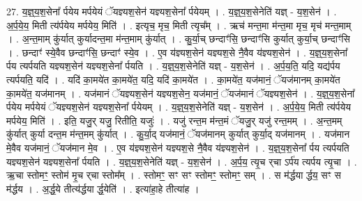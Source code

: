 \documentclass[17pt]{extarticle}
\begin{document}
27. य॒ज्ञ्॒य॒श॒सेना᳚ र्पयेय मर्पयेयं ॅयज्ञ्यश॒सेन॑ यज्ञ्यश॒सेना᳚ र्पयेयम् । . य॒ज्ञ्॒य॒श॒सेनेति॑ यज्ञ् - य॒श॒सेन॑ । . अ॒र्प॒ये॒य॒ मिती त्य॑र्पयेय मर्पयेय॒ मिति॑ । . इत्यृच॒ मृच॒ मिती त्यृच᳚म् । . ऋच॑ मन्त॒मा म॑न्त॒मा मृच॒ मृच॑ मन्त॒माम् । . अ॒न्त॒माम् कु॑र्यात् कुर्यादन्त॒मा म॑न्त॒माम् कु॑र्यात् । . कु॒र्या॒च् छन्दाꣳ॑सि॒ छन्दाꣳ॑सि कुर्यात् कुर्या॒च् छन्दाꣳ॑सि । . छन्दाꣳ॑ स्ये॒वैव छन्दाꣳ॑सि॒ छन्दाꣳ॑ स्ये॒व । . ए॒व य॑ज्ञ्यश॒सेन॑ यज्ञ्यश॒से नै॒वैव य॑ज्ञ्यश॒सेन॑ । . य॒ज्ञ्॒य॒श॒सेना᳚ र्पय त्यर्पयति यज्ञ्यश॒सेन॑ यज्ञ्यश॒सेना᳚ र्पयति । . य॒ज्ञ्॒य॒श॒सेनेति॑ यज्ञ् - य॒श॒सेन॑ । . अ॒र्प॒य॒ति॒ यदि॒ यद्य॑र्पय त्यर्पयति॒ यदि॑ । . यदि॑ का॒मये॑त का॒मये॑त॒ यदि॒ यदि॑ का॒मये॑त । . का॒मये॑त॒ यज॑मानं॒ ॅयज॑मानम् का॒मये॑त का॒मये॑त॒ यज॑मानम् । . यज॑मानं ॅयज्ञ्यश॒सेन॑ यज्ञ्यश॒सेन॒ यज॑मानं॒ ॅयज॑मानं ॅयज्ञ्यश॒सेन॑ । . य॒ज्ञ्॒य॒श॒सेना᳚ र्पयेय मर्पयेयं ॅयज्ञ्यश॒सेन॑ यज्ञ्यश॒सेना᳚ र्पयेयम् । . य॒ज्ञ्॒य॒श॒सेनेति॑ यज्ञ् - य॒श॒सेन॑ । . अ॒र्प॒ये॒य॒ मिती त्य॑र्पयेय मर्पयेय॒ मिति॑ । . इति॒ यजु॒र् यजु॒ रितीति॒ यजुः॑ । . यजु॑ रन्त॒म म॑न्त॒मं ॅयजु॒र् यजु॑ रन्त॒मम् । . अ॒न्त॒मम् कु॑र्यात् कुर्या दन्त॒म म॑न्त॒मम् कु॑र्यात् । . कु॒र्या॒द् यज॑मानं॒ ॅयज॑मानम् कुर्यात् कुर्या॒द् यज॑मानम् । . यज॑मान मे॒वैव यज॑मानं॒ ॅयज॑मान मे॒व । . ए॒व य॑ज्ञ्यश॒सेन॑ यज्ञ्यश॒से नै॒वैव य॑ज्ञ्यश॒सेन॑ । . य॒ज्ञ्॒य॒श॒सेना᳚ र्पय त्यर्पयति यज्ञ्यश॒सेन॑ यज्ञ्यश॒सेना᳚ र्पयति । . य॒ज्ञ्॒य॒श॒सेनेति॑ यज्ञ् - य॒श॒सेन॑ । . अ॒र्प॒य॒ त्यृ॒च र्‌चा ऽर्प॑य त्यर्पय त्यृ॒चा । . ऋ॒चा स्तोमꣳ॒॒ स्तोम॑ मृ॒च र्‌चा स्तोम᳚म् । . स्तोमꣳ॒॒ सꣳ सꣳ स्तोमꣳ॒॒ स्तोमꣳ॒॒ सम् । . स म॑र्द्धया र्द्धय॒ सꣳ स म॑र्द्धय । . अ॒र्द्ध॒ये तीत्य॑र्द्धया र्द्ध॒येति॑ । . इत्या॑हा॒हे तीत्या॑ह । \newline
\end{document}
